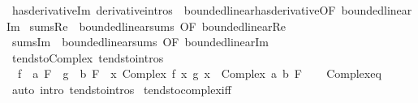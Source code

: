 \begin{isabellebody}
\isamarkupfalse%
\ has{\isacharunderscore}{\kern0pt}derivative{\isacharunderscore}{\kern0pt}Im\ {\isacharbrackleft}{\kern0pt}derivative{\isacharunderscore}{\kern0pt}intros{\isacharbrackright}{\kern0pt}\ {\isacharequal}{\kern0pt}\ bounded{\isacharunderscore}{\kern0pt}linear{\isachardot}{\kern0pt}has{\isacharunderscore}{\kern0pt}derivative{\isacharbrackleft}{\kern0pt}OF\ bounded{\isacharunderscore}{\kern0pt}linear{\isacharunderscore}{\kern0pt}Im{\isacharbrackright}{\kern0pt}\isanewline
{}\isamarkupfalse%
\ sums{\isacharunderscore}{\kern0pt}Re\ {\isacharequal}{\kern0pt}\ bounded{\isacharunderscore}{\kern0pt}linear{\isachardot}{\kern0pt}sums\ {\isacharbrackleft}{\kern0pt}OF\ bounded{\isacharunderscore}{\kern0pt}linear{\isacharunderscore}{\kern0pt}Re{\isacharbrackright}{\kern0pt}\isanewline
{}\isamarkupfalse%
\ sums{\isacharunderscore}{\kern0pt}Im\ {\isacharequal}{\kern0pt}\ bounded{\isacharunderscore}{\kern0pt}linear{\isachardot}{\kern0pt}sums\ {\isacharbrackleft}{\kern0pt}OF\ bounded{\isacharunderscore}{\kern0pt}linear{\isacharunderscore}{\kern0pt}Im{\isacharbrackright}{\kern0pt}\isanewline
\isanewline
{}\isamarkupfalse%
\ tendsto{\isacharunderscore}{\kern0pt}Complex\ {\isacharbrackleft}{\kern0pt}tendsto{\isacharunderscore}{\kern0pt}intros{\isacharbrackright}{\kern0pt}{\isacharcolon}{\kern0pt}\isanewline
\ \ {\isachardoublequoteopen}{\isacharparenleft}{\kern0pt}f\ {\isasymlonglongrightarrow}\ a{\isacharparenright}{\kern0pt}\ F\ {\isasymLongrightarrow}\ {\isacharparenleft}{\kern0pt}g\ {\isasymlonglongrightarrow}\ b{\isacharparenright}{\kern0pt}\ F\ {\isasymLongrightarrow}\ {\isacharparenleft}{\kern0pt}{\isacharparenleft}{\kern0pt}{\isasymlambda}x{\isachardot}{\kern0pt}\ Complex\ {\isacharparenleft}{\kern0pt}f\ x{\isacharparenright}{\kern0pt}\ {\isacharparenleft}{\kern0pt}g\ x{\isacharparenright}{\kern0pt}{\isacharparenright}{\kern0pt}\ {\isasymlonglongrightarrow}\ Complex\ a\ b{\isacharparenright}{\kern0pt}\ F{\isachardoublequoteclose}\isanewline
%
\isadelimproof
\ \ %
\endisadelimproof
%
\isatagproof
{}\isamarkupfalse%
\ Complex{\isacharunderscore}{\kern0pt}eq\ \isamarkupfalse%
\ {\isacharparenleft}{\kern0pt}auto\ intro{\isacharbang}{\kern0pt}{\isacharcolon}{\kern0pt}\ tendsto{\isacharunderscore}{\kern0pt}intros{\isacharparenright}{\kern0pt}%
\endisatagproof
{\isafoldproof}%
%
\isadelimproof
\isanewline
%
\endisadelimproof
\isanewline
{}\isamarkupfalse%
\ tendsto{\isacharunderscore}{\kern0pt}complex{\isacharunderscore}{\kern0pt}iff{\isacharcolon}{\kern0pt}\isanewline

\end{isabellebody}
